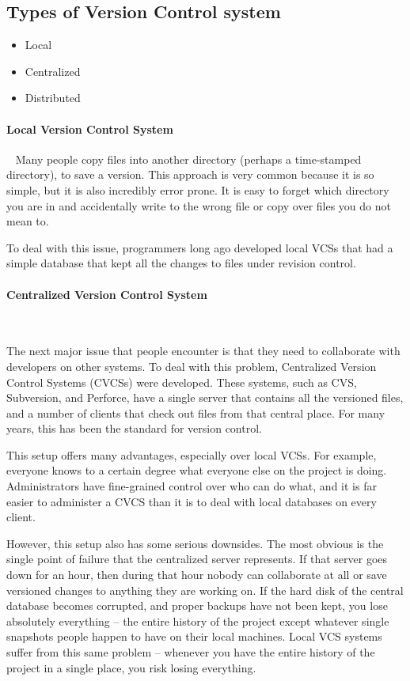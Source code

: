 \documentclass{book}
\begin{document}
    \subsection*{Types of Version Control system}

    \begin{itemize}
        \item Local
        \item Centralized
        \item Distributed
    \end{itemize}
    \paragraph{Local Version Control System} ~
    Many people copy files into another directory (perhaps a time-stamped
directory), to save a version. This approach is very common because it
is so simple, but it is also incredibly error prone. It is easy to
forget which directory you are in and accidentally write to the wrong
file or copy over files you do not mean to.

    To deal with this issue, programmers long ago developed local VCSs that
had a simple database that kept all the changes to files under revision
control.

    \paragraph{Centralized Version Control System} ~

    The next major issue that people encounter is that they need to
collaborate with developers on other systems. To deal with this problem,
Centralized Version Control Systems (CVCSs) were developed. These
systems, such as CVS, Subversion, and Perforce, have a single server
that contains all the versioned files, and a number of clients that
check out files from that central place. For many years, this has been
the standard for version control.

    This setup offers many advantages, especially over local VCSs. For
example, everyone knows to a certain degree what everyone else on the
project is doing. Administrators have fine-grained control over who can
do what, and it is far easier to administer a CVCS than it is to deal
with local databases on every client.

    However, this setup also has some serious downsides. The most obvious is the single point of failure that the centralized server represents. If
that server goes down for an hour, then during that hour nobody can
collaborate at all or save versioned changes to anything they are
working on. If the hard disk of the central database becomes corrupted,
and proper backups have not been kept, you lose absolutely everything –
the entire history of the project except whatever single snapshots
people happen to have on their local machines. Local VCS systems suffer
from this same problem – whenever you have the entire history of the
project in a single place, you risk losing everything.
\end{document}
